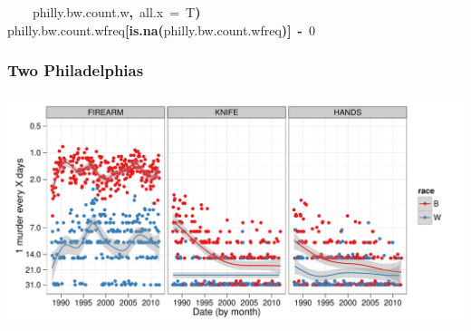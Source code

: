 \documentclass[]{beamer}
\makeatletter
\newcommand{\hlnumber}[1]{\textcolor[rgb]{0,0,0}{#1}}%
\newcommand{\hlfunctioncall}[1]{\textcolor[rgb]{.5,0,.33}{\textbf{#1}}}%
\newcommand{\hlkeyword}[1]{\textbf{#1}}%
\newcommand{\hlargument}[1]{\textcolor[rgb]{.69,.25,.02}{#1}}%
\newcommand{\hlassignement}[1]{\textbf{#1}}%
\newcommand{\hlsymbol}[1]{#1}%
\newcommand{\hlstd}[1]{\textcolor[rgb]{0,0,0}{#1}}%
\newenvironment{kframe}{%
 \def\FrameCommand##1{\hskip\@totalleftmargin \hskip-\fboxsep
 \colorbox{shadecolor}{##1}\hskip-\fboxsep
     \hskip-\linewidth \hskip-\@totalleftmargin \hskip\columnwidth}%
 \MakeFramed {\advance\hsize-\width
   \@totalleftmargin\z@ \linewidth\hsize
   \@setminipage}}%
 {\par\unskip\endMakeFramed}
\newenvironment{knitrout}{}{} %
\renewenvironment{knitrout}{\begin{footnotesize}}{\end{footnotesize}}
\makeatother
\begin{document}
\begin{frame}[fragile]
\begin{knitrout}
\begin{kframe}
\begin{flushleft}
\hlstd{}{\ }{\ }{\ }{\ }\hlsymbol{philly.bw.count.w}\hlkeyword{,}{\ }\hlargument{all.x}{\ }\hlargument{=}{\ }\hlsymbol{T}\hlkeyword{)}\hspace*{\fill}\\
\hlstd{}\hlsymbol{philly.bw.count.w}\hlkeyword{\usebox{\hlnormalsizeboxdollar}}\hlsymbol{freq}\hlkeyword{[}\hlfunctioncall{is.na}\hlkeyword{(}\hlsymbol{philly.bw.count.w}\hlkeyword{\usebox{\hlnormalsizeboxdollar}}\hlsymbol{freq}\hlkeyword{)}\hlkeyword{]}{\ }\hlassignement{\usebox{\hlnormalsizeboxlessthan}-}{\ }\hlnumber{0}\mbox{}
\normalfont
\end{flushleft}
\end{kframe}
\end{knitrout}


\end{frame}

\begin{frame}
\frametitle{Two Philadelphias}



\begin{knitrout}
\color{fgcolor}\includegraphics[width=\linewidth]{figures/murder-unnamed-chunk-15} 
\end{knitrout}

\end{frame}
\end{document}
